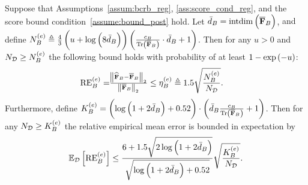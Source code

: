 \begin{theorem}\label{thm:sampling_post}
%
{Suppose that Assumptions~\ref{assum:bcrb_reg}, \ref{ass:score_cond_reg}, and the score bound %
condition~\ref{assume:bound_post} hold.} 
    Let ${\bar{d}_B}=\mathrm{intdim}\left(\overline{\mathbf{F}}_{B}\right)$,
    {and define 
    $N_B^{(e)}\triangleq\frac{4}{3}\left(u+\log\left(8 {\bar{d}_B}\right)\right)\left(\frac{c_B}{\mathrm{Tr}\left(\overline{\mathbf{F}}_{B}\right)}\cdot {\bar{d}_B}+1\right)$. %
    }
    Then for any $u>0$ 
    {and $N_{\mathcal{D}} \geq N_B^{(e)}$} the following bound holds with probability %
    {of at least } $1-\exp{\left(-u\right)}$:
    \begin{align}\label{eq:re_error_post_mean}
        {\mathrm{RE}_{B}^{(e)}}=&\tfrac{\norm{\widehat{\mathbf{F}}_{B}-\overline{\mathbf{F}}_{B}}_2}{\norm{\overline{\mathbf{F}}_{B}}_2}\leq \eta_{B}^{(e)}\triangleq 
        {1.5\sqrt{\frac{N_B^{(e)}}{N_{\mathcal{D}}}}}.
    \end{align}
    Furthermore, %
    {define
    ${K}_B^{(e)}=\left(\log\left(1+2{\bar{d}_B}\right) +{0.52}\right) \cdot\left({\bar{d}_B}\frac{c_B}{\mathrm{Tr}\left(\overline{\mathbf{F}}_{B}\right)}+1\right)$. Then for any $N_{\mathcal{D}}\geq{K}_B^{(e)}$ the relative empirical mean error is bounded in expectation by
    }
     \begin{align}\label{eq:emprical_mean_error_post_expection}
        \mathbb{E}_{\mathcal{D}}\left[\mathrm{RE}_{B}^{(e)}\right]\leq
        {\frac{6+1.5\sqrt{2\log\left(1+2{\bar{d}_B}\right)}}{\sqrt{\log\left(1+2{\bar{d}_B}\right) +{0.52}}
        }}\sqrt{\frac{{K}_B^{(e)}}{N_{\mathcal{D}}}}.
    \end{align}
\end{theorem}


